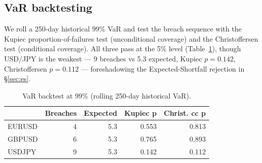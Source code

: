 \documentclass[11pt,a4paper]{article}
\begin{document}
\subsection{VaR backtesting}
We roll a 250-day historical 99\% VaR and test the breach sequence with the Kupiec proportion-of-failures
test (unconditional coverage) and the Christoffersen test (conditional coverage). All three pass at the
5\% level (Table~\ref{tab:vbt}), though USD/JPY is the weakest --- 9 breaches vs 5.3 expected, Kupiec
$p=0.142$, Christoffersen $p=0.112$ --- foreshadowing the Expected-Shortfall rejection in \S\ref{sec:es}.
\begin{table}[H]\centering
\small
\caption{VaR backtest at 99\% (rolling 250-day historical VaR).}\label{tab:vbt}
\begin{tabular}{lrrrr}
\toprule
 & Breaches & Expected & Kupiec p & Christ. cc p \\
\midrule
EURUSD & 4 & 5.3 & 0.553 & 0.813 \\
GBPUSD & 6 & 5.3 & 0.765 & 0.893 \\
USDJPY & 9 & 5.3 & 0.142 & 0.112 \\
\bottomrule
\end{tabular}
\end{table}
\end{document}
